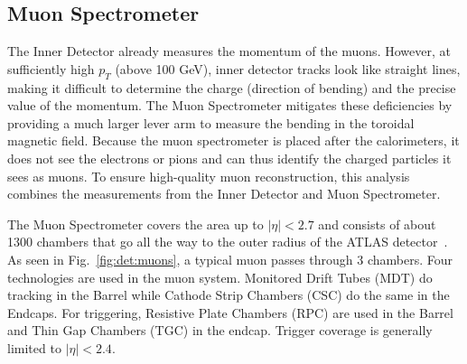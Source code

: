 \subsection{ Muon Spectrometer }
\label{chap:det:ms}
The Inner Detector already measures the momentum of the muons. However, at sufficiently high $p_T$ (above 100 GeV), inner detector tracks look like straight lines, making it difficult to determine the charge (direction of bending) and the precise value of the momentum. The Muon Spectrometer mitigates these deficiencies by providing a much larger lever arm to measure the bending in the toroidal magnetic field. Because the muon spectrometer is placed after the calorimeters, it does not see the electrons or pions and can thus identify the charged particles it sees as muons. To ensure high-quality muon reconstruction, this analysis combines the measurements from the Inner Detector and Muon Spectrometer.

The Muon Spectrometer covers the area up to $|\eta|<2.7$ and consists of about 1300 chambers that go all the way to the outer radius of the ATLAS detector~\cite{muon_tdr}. As seen in Fig.~\ref{fig:det:muons}, a typical muon passes through 3 chambers. Four technologies are used in the muon system. Monitored Drift Tubes (MDT) do tracking in the Barrel while Cathode Strip Chambers (CSC) do the same in the Endcaps. For triggering, Resistive Plate Chambers (RPC) are used in the Barrel and Thin Gap Chambers (TGC) in the endcap. Trigger coverage is generally limited to $|\eta|<2.4$.


